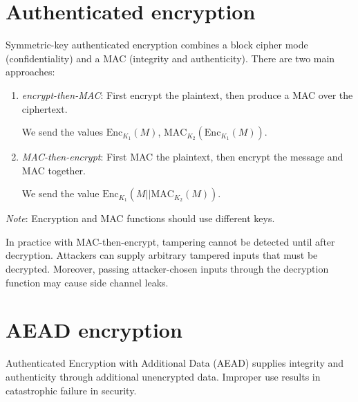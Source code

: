 \section{Authenticated encryption}
Symmetric-key authenticated encryption combines a block cipher mode (confidentiality) and a MAC (integrity and authenticity). There are two main approaches:
\begin{enumerate}
    \item \emph{encrypt-then-MAC}: First encrypt the plaintext, then produce a MAC over the ciphertext. 
    
    We send the values $\text{Enc}_{K_1}(M)$, $\text{MAC}_{K_2}(\text{Enc}_{K_1}(M))$.
    
    \item \emph{MAC-then-encrypt}: First MAC the plaintext, then encrypt the message and MAC together. 
    
    We send the value $\text{Enc}_{K_1}(M || \text{MAC}_{K_2}(M))$.
\end{enumerate}

\medskip

\emph{Note}: Encryption and MAC functions should use different keys.

\medskip

In practice with MAC-then-encrypt, tampering cannot be detected until after decryption. Attackers can supply arbitrary tampered inputs that must be decrypted. Moreover, passing attacker-chosen inputs through the decryption function may cause side channel leaks.

\section{AEAD encryption}
Authenticated Encryption with Additional Data (AEAD) supplies integrity and authenticity through additional unencrypted data. Improper use results in catastrophic failure in security.